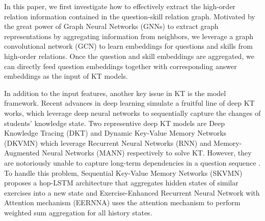 \documentclass[runningheads]{llncs}
\begin{document}
In this paper, we first investigate how to effectively extract the high-order relation information contained in the question-skill relation graph. Motivated by the great power of Graph Neural Networks (GNNs) \cite{gat,kipf2016semi,hamilton2017inductive} to extract graph representations by aggregating information from neighbors, we leverage a graph convolutional network (GCN) to learn embeddings for questions and skills from high-order relations. Once the question and skill embeddings are aggregated, we can directly feed question embeddings together with corresponding answer embeddings as the input of KT models. 


In addition to the input features, another key issue in KT is the model framework. Recent advances in deep learning simulate a fruitful line of deep KT works, which leverage deep neural networks to sequentially capture the changes of students' knowledge state. Two representive deep KT models are Deep Knowledge Tracing (DKT) \cite{dkt} and Dynamic Key-Value Memory Networks (DKVMN) \cite{dkvmn} which leverage Recurrent Neural Networks (RNN) \cite{williams1989learning} and Memory-Augmented Neural Networks (MANN) respectively to solve KT. However, they are notoriously unable to capture long-term dependencies in a question sequence \cite{skvmn}. To handle this problem, Sequential Key-Value Memory Networks (SKVMN) \cite{skvmn} proposes a hop-LSTM architecture that aggregates hidden states of similar exercises into a new state and Exercise-Enhanced Recurrent Neural Network with Attention mechanism (EERNNA) \cite{su2018exercise} uses the attention mechanism to perform weighted sum aggregation for all history states.
\end{document}
